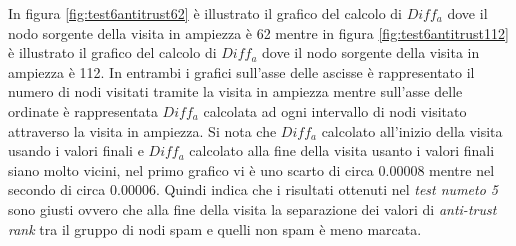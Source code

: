 In figura \ref{fig:test6antitrust62}  è illustrato il grafico del calcolo di \(Diff_a\) dove il nodo sorgente della visita in ampiezza è 62 mentre in figura \ref{fig:test6antitrust112} è illustrato il grafico del calcolo di \(Diff_a\) dove il nodo sorgente della visita in ampiezza è 112. In entrambi i grafici sull'asse delle ascisse è rappresentato il numero di nodi visitati tramite la visita in ampiezza mentre sull'asse delle ordinate è rappresentata \(Diff_a\) calcolata ad ogni intervallo di nodi visitato attraverso la visita in ampiezza. Si nota che \(Diff_a\) calcolato all'inizio della visita usando i valori finali e \(Diff_a\) calcolato alla fine della visita usanto i valori finali siano molto vicini, nel primo grafico vi è uno  scarto di circa 0.00008 mentre nel secondo di circa 0.00006. Quindi indica che i risultati ottenuti nel \textit{test numeto 5} sono giusti ovvero che alla fine della visita la separazione dei valori di \textit{anti-trust rank} tra il gruppo di nodi spam e quelli non spam è meno 
marcata.

